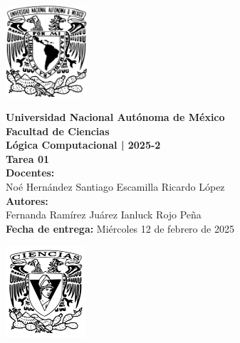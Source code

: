 \documentclass[11pt,letterpaper]{article}
\begin{document}
\begin{center}
  \begin{minipage}{3cm}
    \begin{center}
      \includegraphics[height=3.4cm]{unam_logo.png}
    \end{center}
  \end{minipage}\hfill
  \begin{minipage}{10cm}
    \begin{center}
      \textbf{\Large Universidad Nacional Autónoma de México}\\[0.2cm]
      \textbf{\large Facultad de Ciencias}\\[0.2cm]
      \textbf{Lógica Computacional | 2025-2}\\[0.4cm]
      \textbf{\Large Tarea 01}\\[0.1cm]
      \textbf{Docentes:}\\
      Noé Hernández \hspace{1em} Santiago Escamilla \hspace{1em} Ricardo López\\[0.3cm]
      \textbf{Autores:}\\
      Fernanda Ramírez Juárez \quad Ianluck Rojo Peña\\[0.3cm]
      \textbf{Fecha de entrega:} Miércoles 12 de febrero de 2025
    \end{center}
  \end{minipage}\hfill
  \begin{minipage}{3cm}
    \begin{center}
      \includegraphics[height=3.4cm]{fc_logo.png}
    \end{center}
  \end{minipage}
\end{center}
\end{document}
